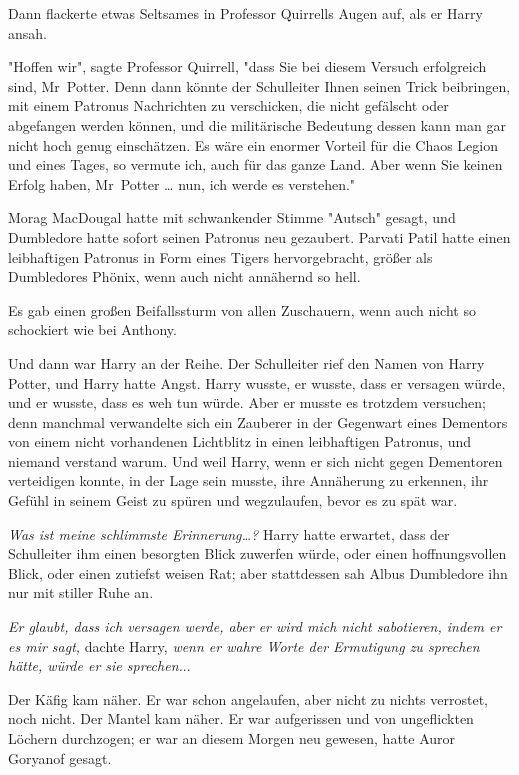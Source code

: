 {Dann flackerte etwas Seltsames in Professor Quirrells Augen auf, als er Harry ansah.

"Hoffen wir", sagte Professor Quirrell, "dass Sie bei diesem Versuch erfolgreich sind, Mr~Potter. Denn dann könnte der Schulleiter Ihnen seinen Trick beibringen, mit einem Patronus Nachrichten zu verschicken, die nicht gefälscht oder abgefangen werden können, und die militärische Bedeutung dessen kann man gar nicht hoch genug einschätzen. Es wäre ein enormer Vorteil für die Chaos Legion und eines Tages, so vermute ich, auch für das ganze Land. Aber wenn Sie keinen Erfolg haben, Mr~Potter … nun, ich werde es verstehen."

Morag MacDougal hatte mit schwankender Stimme "Autsch" gesagt, und Dumbledore hatte sofort seinen Patronus neu gezaubert. Parvati Patil hatte einen leibhaftigen Patronus in Form eines Tigers hervorgebracht, größer als Dumbledores Phönix, wenn auch nicht annähernd so hell.

Es gab einen großen Beifallssturm von allen Zuschauern, wenn auch nicht so schockiert wie bei Anthony.

Und dann war Harry an der Reihe. Der Schulleiter rief den Namen von Harry Potter, und Harry hatte Angst. Harry wusste, er wusste, dass er versagen würde, und er wusste, dass es weh tun würde. Aber er musste es trotzdem versuchen; denn manchmal verwandelte sich ein Zauberer in der Gegenwart eines Dementors von einem nicht vorhandenen Lichtblitz in einen leibhaftigen Patronus, und niemand verstand warum. Und weil Harry, wenn er sich nicht gegen Dementoren verteidigen konnte, in der Lage sein musste, ihre Annäherung zu erkennen, ihr Gefühl in seinem Geist zu spüren und wegzulaufen, bevor es zu spät war.

\emph{\hfill\break Was ist meine schlimmste Erinnerung…?} Harry hatte erwartet, dass der Schulleiter ihm einen besorgten Blick zuwerfen würde, oder einen hoffnungsvollen Blick, oder einen zutiefst weisen Rat; aber stattdessen sah Albus Dumbledore ihn nur mit stiller Ruhe an.

\emph{Er glaubt, dass ich versagen werde, aber er wird mich nicht sabotieren, indem er es mir sagt,} dachte Harry, \emph{wenn er wahre Worte der Ermutigung zu sprechen hätte, würde er sie sprechen.}..

Der Käfig kam näher. Er war schon angelaufen, aber nicht zu nichts verrostet, noch nicht. Der Mantel kam näher. Er war aufgerissen und von ungeflickten Löchern durchzogen; er war an diesem Morgen neu gewesen, hatte Auror Goryanof gesagt.

}
